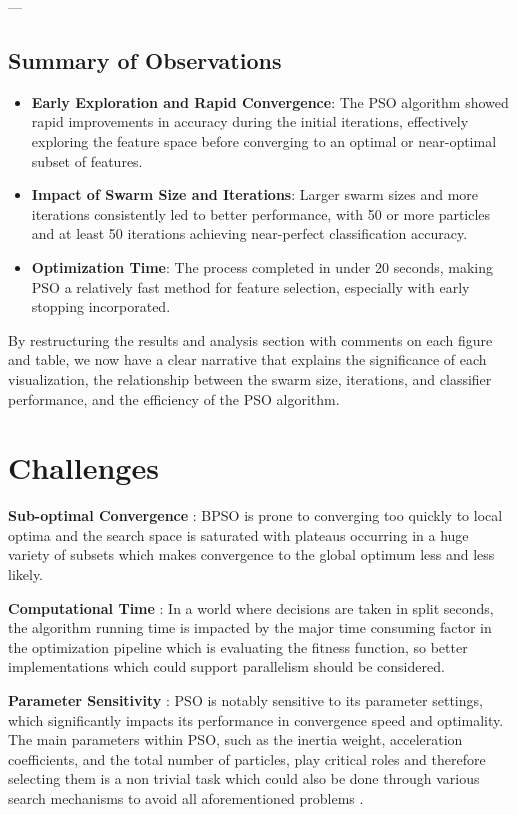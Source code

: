 \documentclass[12pt]{article}
\begin{document}
---

\subsection{Summary of Observations}

\begin{itemize}
    \item \textbf{Early Exploration and Rapid Convergence}: The PSO algorithm showed rapid improvements in accuracy during the initial iterations, effectively exploring the feature space before converging to an optimal or near-optimal subset of features.
    \item \textbf{Impact of Swarm Size and Iterations}: Larger swarm sizes and more iterations consistently led to better performance, with 50 or more particles and at least 50 iterations achieving near-perfect classification accuracy.
    \item \textbf{Optimization Time}: The process completed in under 20 seconds, making PSO a relatively fast method for feature selection, especially with early stopping incorporated.
\end{itemize}

By restructuring the results and analysis section with comments on each figure and table, we now have a clear narrative that explains the significance of each visualization, the relationship between the swarm size, iterations, and classifier performance, and the efficiency of the PSO algorithm.



\section{Challenges}
\textbf{Sub-optimal Convergence} : BPSO is prone to converging too quickly to local optima and the search space is saturated with plateaus occurring in a huge variety of subsets which makes convergence to the global optimum less and less likely.

\textbf{Computational Time} : In a world where decisions are taken in split seconds, the algorithm running time is impacted by the major time consuming factor in the optimization pipeline which is evaluating the fitness function, so better implementations which could support parallelism should be considered.

\textbf{Parameter Sensitivity} : PSO is notably sensitive to its parameter settings, which significantly impacts its performance in convergence speed and optimality. The main parameters within PSO, such as the inertia weight, acceleration coefficients, and the total number of particles, play critical roles and therefore selecting them is a non trivial task which could also be done through various search mechanisms to avoid all aforementioned problems \cite{mostafa2022convergencepso}.
\end{document}
